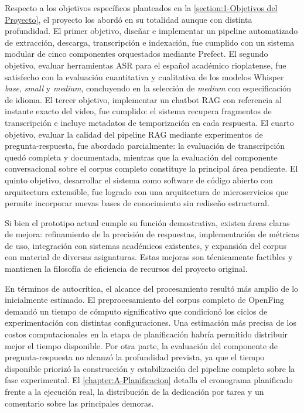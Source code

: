 Respecto a los objetivos específicos planteados en la \autoref{section:1-Objetivos del Proyecto}, el proyecto los abordó en su totalidad aunque con distinta profundidad. El primer objetivo, diseñar e implementar un pipeline automatizado de extracción, descarga, transcripción e indexación, fue cumplido con un sistema modular de cinco componentes orquestados mediante Prefect. El segundo objetivo, evaluar herramientas ASR para el español académico rioplatense, fue satisfecho con la evaluación cuantitativa y cualitativa de los modelos Whisper \textit{base}, \textit{small} y \textit{medium}, concluyendo en la selección de \textit{medium} con especificación de idioma. El tercer objetivo, implementar un chatbot RAG con referencia al instante exacto del video, fue cumplido: el sistema recupera fragmentos de transcripción e incluye metadatos de temporización en cada respuesta. El cuarto objetivo, evaluar la calidad del pipeline RAG mediante experimentos de pregunta-respuesta, fue abordado parcialmente: la evaluación de transcripción quedó completa y documentada, mientras que la evaluación del componente conversacional sobre el corpus completo constituye la principal área pendiente. El quinto objetivo, desarrollar el sistema como software de código abierto con arquitectura extensible, fue logrado con una arquitectura de microservicios que permite incorporar nuevas bases de conocimiento sin rediseño estructural.

Si bien el prototipo actual cumple su función demostrativa, existen áreas claras de mejora: refinamiento de la precisión de respuestas, implementación de métricas de uso, integración con sistemas académicos existentes, y expansión del corpus con material de diversas asignaturas. Estas mejoras son técnicamente factibles y mantienen la filosofía de eficiencia de recursos del proyecto original.

En términos de autocrítica, el alcance del procesamiento resultó más amplio de lo inicialmente estimado. El preprocesamiento del corpus completo de OpenFing demandó un tiempo de cómputo significativo que condicionó los ciclos de experimentación con distintas configuraciones. Una estimación más precisa de los costos computacionales en la etapa de planificación habría permitido distribuir mejor el tiempo disponible. Por otra parte, la evaluación del componente de pregunta-respuesta no alcanzó la profundidad prevista, ya que el tiempo disponible priorizó la construcción y estabilización del pipeline completo sobre la fase experimental. El \autoref{chapter:A-Planificacion} detalla el cronograma planificado frente a la ejecución real, la distribución de la dedicación por tarea y un comentario sobre las principales demoras.


